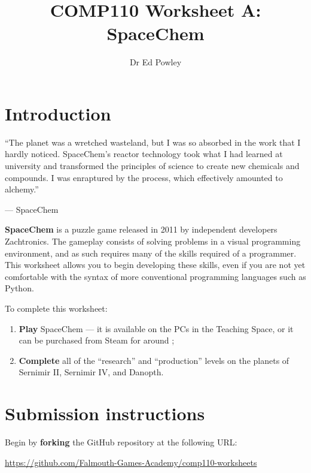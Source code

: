 \documentclass{../../../fal_assignment}
\title{COMP110 Worksheet A: SpaceChem}
\author{Dr Ed Powley}
\begin{document}
\maketitle

\section*{Introduction}

\begin{marginquote}
``The planet was a wretched wasteland, but I was so absorbed in the work that I hardly noticed. SpaceChem's reactor technology took what I had learned at university and transformed the principles of science to create new chemicals and compounds. I was enraptured by the process, which effectively amounted to alchemy.''

--- SpaceChem
\end{marginquote}

\textbf{SpaceChem} is a puzzle game released in 2011 by independent developers Zachtronics. The gameplay consists of solving problems in a visual programming environment, and as such requires many of the skills required of a programmer. This worksheet allows you to begin developing these skills, even if you are not yet comfortable with the syntax of more conventional programming languages such as Python.

To complete this worksheet:
\begin{enumerate}[label=(\alph*)]
	\item \textbf{Play} SpaceChem --- it is available on the PCs in the Teaching Space,
		or it can be purchased from Steam for around ;
 	\item \textbf{Complete} all of the ``research'' and ``production'' levels on the planets of Sernimir II, Sernimir IV, and Danopth.
\end{enumerate}

\section*{Submission instructions}

Begin by \textbf{forking} the GitHub repository at the following URL:

\url{https://github.com/Falmouth-Games-Academy/comp110-worksheets}
\end{document}

